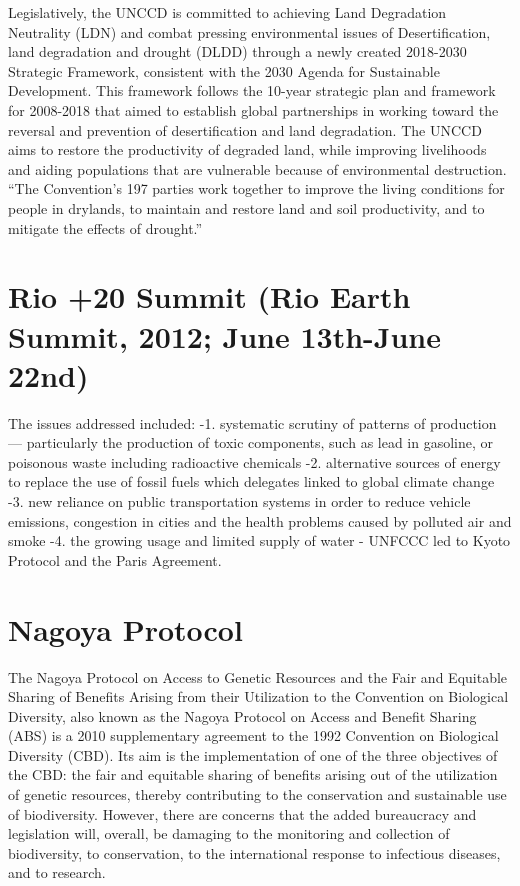 \documentclass[
]{book}
\begin{document}
Legislatively, the UNCCD is committed to achieving Land Degradation Neutrality (LDN) and combat pressing environmental issues of Desertification, land degradation and drought (DLDD) through a newly created 2018-2030 Strategic Framework, consistent with the 2030 Agenda for Sustainable Development. This framework follows the 10-year strategic plan and framework for 2008-2018 that aimed to establish global partnerships in working toward the reversal and prevention of desertification and land degradation. The UNCCD aims to restore the productivity of degraded land, while improving livelihoods and aiding populations that are vulnerable because of environmental destruction. ``The Convention's 197 parties work together to improve the living conditions for people in drylands, to maintain and restore land and soil productivity, and to mitigate the effects of drought.''

\hypertarget{rio-20-summit-rio-earth-summit-2012-june-13th-june-22nd}{%
\section{Rio +20 Summit (Rio Earth Summit, 2012; June 13th-June 22nd)}\label{rio-20-summit-rio-earth-summit-2012-june-13th-june-22nd}}

The issues addressed included:
-1. systematic scrutiny of patterns of production --- particularly the production of toxic components, such as lead in gasoline, or poisonous waste including radioactive chemicals
-2. alternative sources of energy to replace the use of fossil fuels which delegates linked to global climate change
-3. new reliance on public transportation systems in order to reduce vehicle emissions, congestion in cities and the health problems caused by polluted air and smoke
-4. the growing usage and limited supply of water
- UNFCCC led to Kyoto Protocol and the Paris Agreement.

\hypertarget{nagoya-protocol}{%
\section{Nagoya Protocol}\label{nagoya-protocol}}

The Nagoya Protocol on Access to Genetic Resources and the Fair and Equitable Sharing of Benefits Arising from their Utilization to the Convention on Biological Diversity, also known as the Nagoya Protocol on Access and Benefit Sharing (ABS) is a 2010 supplementary agreement to the 1992 Convention on Biological Diversity (CBD). Its aim is the implementation of one of the three objectives of the CBD: the fair and equitable sharing of benefits arising out of the utilization of genetic resources, thereby contributing to the conservation and sustainable use of biodiversity. However, there are concerns that the added bureaucracy and legislation will, overall, be damaging to the monitoring and collection of biodiversity, to conservation, to the international response to infectious diseases, and to research.
\end{document}
